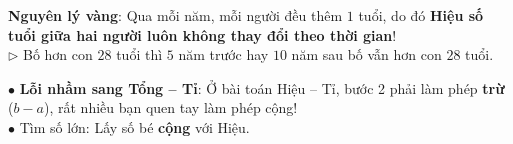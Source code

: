 \documentclass[14pt,a4paper,oneside]{extbook}
\begin{document}
\noindent
\begin{minipage}[t]{0.54\textwidth}
  \begin{tcolorbox}[
    enhanced,
    title={\footnotesize\bfseries\color{white}\faUsers\ Bài toán tuổi tác: Hiệu số tuổi KHÔNG ĐỔI},
    colback=green!3!white,
    colframe=green!60!black,
    arc=2.5mm, boxrule=0.8pt, top=1.8mm, bottom=1.8mm, left=2.2mm, right=2.2mm
  ]
    \footnotesize
    \textbf{Nguyên lý vàng}: Qua mỗi năm, mỗi người đều thêm $1$ tuổi, do đó \textbf{Hiệu số tuổi giữa hai người luôn không thay đổi theo thời gian}!\\
    $\triangleright$ Bố hơn con $28$ tuổi thì $5$ năm trước hay $10$ năm sau bố vẫn hơn con $28$ tuổi.
  \end{tcolorbox}
\end{minipage}%
\hfill
\begin{minipage}[t]{0.44\textwidth}
  \begin{tcolorbox}[
    enhanced,
    title={\footnotesize\bfseries\color{white}\faExclamationTriangle\ Mẹo tránh bẫy trắc nghiệm},
    colback=red!2!white,
    colframe=red!70!black,
    arc=2.5mm, boxrule=0.8pt, top=1.8mm, bottom=1.8mm, left=2.2mm, right=2.2mm
  ]
    \footnotesize
    $\bullet$ \textbf{Lỗi nhầm sang Tổng -- Tỉ}: Ở bài toán Hiệu -- Tỉ, bước 2 phải làm phép \textbf{trừ} ($b - a$), rất nhiều bạn quen tay làm phép cộng!\\
    $\bullet$ Tìm số lớn: Lấy số bé \textbf{cộng} với Hiệu.
  \end{tcolorbox}
\end{minipage}
\end{document}
